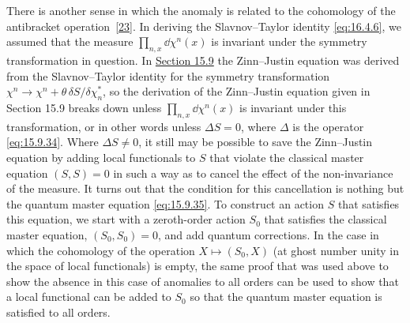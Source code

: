 There is another sense in which the anomaly is related to the cohomology
of the antibracket operation~\hyperref[ch22-ref-23]{[23]}. In deriving the
Slavnov--Taylor identity \eqref{eq:16.4.6}, we assumed that the measure
$\prod_{n,x}\dd\chi^n(x)$ is invariant under the symmetry transformation in
question. In \hyperref[sec:15.9]{Section 15.9} the Zinn--Justin equation was
derived from the Slavnov--Taylor identity for the symmetry transformation
$\chi^n\rightarrow\chi^n+\theta\,\delta S/\delta\chi_n^*$, so the
derivation of the Zinn--Justin equation given in Section 15.9 breaks down
unless $\prod_{n,x}\dd\chi^n(x)$ is invariant under this transformation, or
in other words unless $\Delta S=0$, where $\Delta$ is the operator
\eqref{eq:15.9.34}. Where $\Delta S\neq0$, it still may be possible to save
the Zinn--Justin equation by adding local functionals to $S$ that violate
the classical master equation $(S,S)=0$ in such a way as to cancel the
effect of the non-invariance of the measure. It turns out that the
condition for this cancellation is nothing but the quantum master equation
\eqref{eq:15.9.35}. To construct an action $S$ that satisfies this
equation, we start with a zeroth-order action $S_0$ that satisfies the
classical master equation, $(S_0,S_0)=0$, and add quantum corrections. In
the case in which the cohomology of the operation $X\mapsto(S_0,X)$ (at
ghost number unity in the space of local functionals) is empty, the same
proof that was used above to show the absence in this case of anomalies to
all orders can be used to show that a local functional can be added to
$S_0$ so that the quantum master equation is satisfied to all orders.
